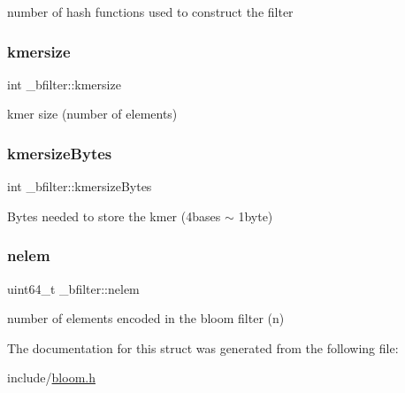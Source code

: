 number of hash functions used to construct the filter \mbox{\label{struct__bfilter_aaccbef9fad8a88369249ff0638b2a032}} 
\subsubsection{\texorpdfstring{kmersize}{kmersize}}
{\footnotesize\ttfamily int \+\_\+bfilter\+::kmersize}

kmer size (number of elements) \mbox{\label{struct__bfilter_aa7612223f56f3bb6cb40d96645bc982e}} 
\subsubsection{\texorpdfstring{kmersize\+Bytes}{kmersizeBytes}}
{\footnotesize\ttfamily int \+\_\+bfilter\+::kmersize\+Bytes}

Bytes needed to store the kmer (4bases $\sim$ 1byte) \mbox{\label{struct__bfilter_afdabad504407bfdee536cf67c66303c4}} 
\subsubsection{\texorpdfstring{nelem}{nelem}}
{\footnotesize\ttfamily uint64\+\_\+t \+\_\+bfilter\+::nelem}

number of elements encoded in the bloom filter (n) 

The documentation for this struct was generated from the following file\+:\begin{DoxyCompactItemize}
\item 
include/\mbox{\hyperlink{bloom_8h}{bloom.\+h}}\end{DoxyCompactItemize}
